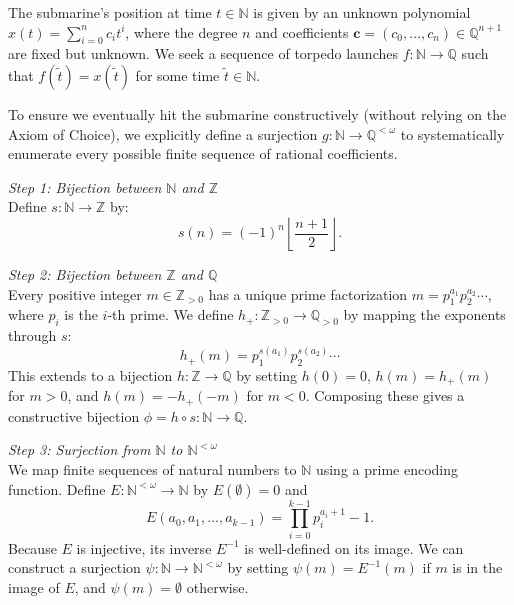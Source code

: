 \begin{solution}
    The submarine's position at time \( t \in \mathbb{N} \) is given by an unknown polynomial \( x\left(t\right) = \sum_{i=0}^{n} c_i t^{i} \), where the degree \( n \) and coefficients \( \mathbf{c} = \left(c_0, \dots, c_n\right) \in \mathbb{Q}^{n+1} \) are fixed but unknown. We seek a sequence of torpedo launches \( f: \mathbb{N} \to \mathbb{Q} \) such that \( f\left(\tilde{t}\right) = x\left(\tilde{t}\right) \) for some time \( \tilde{t} \in \mathbb{N} \).

    To ensure we eventually hit the submarine constructively (without relying on the Axiom of Choice), we explicitly define a surjection \( g: \mathbb{N} \to \mathbb{Q}^{<\omega} \) to systematically enumerate every possible finite sequence of rational coefficients.

    \textit{Step 1: Bijection between \( \mathbb{N} \) and \( \mathbb{Z} \)} \\
    Define \( s: \mathbb{N} \to \mathbb{Z} \) by:
    \[
        s\left(n\right) = \left(-1\right)^n \left\lfloor \frac{n + 1}{2} \right\rfloor.
    \]

    \textit{Step 2: Bijection between \( \mathbb{Z} \) and \( \mathbb{Q} \)} \\
    Every positive integer \( m \in \mathbb{Z}_{>0} \) has a unique prime factorization \( m = p_1^{a_1} p_2^{a_2} \cdots \), where \( p_i \) is the \( i \)-th prime. We define \( h_+: \mathbb{Z}_{>0} \to \mathbb{Q}_{>0} \) by mapping the exponents through \( s \):
    \[
        h_+\left(m\right) = p_1^{s\left(a_1\right)} p_2^{s\left(a_2\right)} \cdots
    \]
    This extends to a bijection \( h: \mathbb{Z} \to \mathbb{Q} \) by setting \( h\left(0\right) = 0 \), \( h\left(m\right) = h_+\left(m\right) \) for \( m > 0 \), and \( h\left(m\right) = -h_+\left(-m\right) \) for \( m < 0 \). Composing these gives a constructive bijection \( \phi = h \circ s: \mathbb{N} \to \mathbb{Q} \).

    \textit{Step 3: Surjection from \( \mathbb{N} \) to \( \mathbb{N}^{<\omega} \)} \\
    We map finite sequences of natural numbers to \( \mathbb{N} \) using a prime encoding function. Define \( E: \mathbb{N}^{<\omega} \to \mathbb{N} \) by \( E\left(\emptyset\right) = 0 \) and
    \[
        E\left(a_0, a_1, \dots, a_{k-1}\right) = \prod_{i=0}^{k-1} p_i^{a_i + 1} - 1.
    \]
    Because \( E \) is injective, its inverse \( E^{-1} \) is well-defined on its image. We can construct a surjection \( \psi: \mathbb{N} \to \mathbb{N}^{<\omega} \) by setting \( \psi\left(m\right) = E^{-1}\left(m\right) \) if \( m \) is in the image of \( E \), and \( \psi\left(m\right) = \emptyset \) otherwise.


\end{solution}
